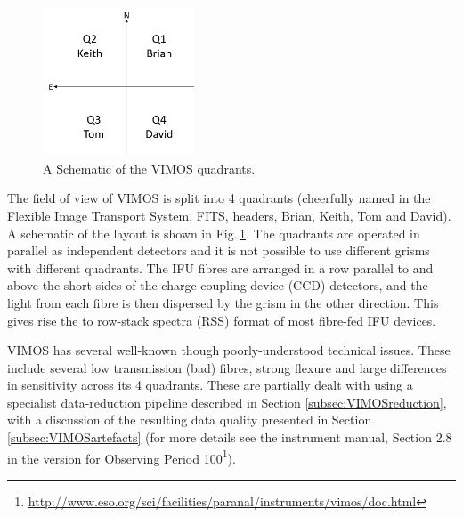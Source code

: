 		\begin{figure}
			\centering
			\includegraphics[width=0.4\textwidth]{chapter2/quadrants.png}
			\caption[Schematic of the VIMOS quadrants]{A Schematic of the VIMOS quadrants.}
			\label{fig:quadrants}
		\end{figure}

		The field of view of VIMOS is split into 4 quadrants (cheerfully named in the Flexible Image Transport System, FITS, headers, Brian, Keith, Tom and David). A schematic of the layout is shown in Fig.\,\ref{fig:quadrants}. The quadrants are operated in parallel as independent detectors and it is not possible to use different grisms with different quadrants. The IFU fibres are arranged in a row parallel to and above the short sides of the charge-coupling device (CCD) detectors, and the light from each fibre is then dispersed by the grism in the other direction. This gives rise the to row-stack spectra (RSS) format of most fibre-fed IFU devices.

		VIMOS has several well-known though poorly-understood technical issues. These include several low transmission (bad) fibres, strong flexure and large differences in sensitivity across its 4 quadrants. These are partially dealt with using a specialist data-reduction pipeline described in Section \ref{subsec:VIMOSreduction}, with a discussion of the resulting data quality presented in Section \ref{subsec:VIMOSartefacts} (for more details see the instrument manual, Section 2.8 in the version for Observing Period 100\footnote{\url{http://www.eso.org/sci/facilities/paranal/instruments/vimos/doc.html}}).


